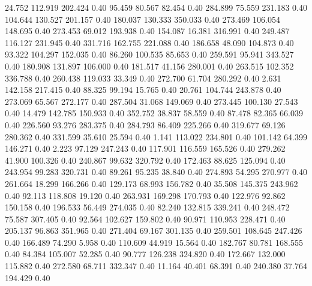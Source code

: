   24.752  112.919  202.424         0.40
  95.459   80.567   82.454         0.40
 284.899   75.559  231.183         0.40
 104.644  130.527  201.157         0.40
 180.037  130.333  350.033         0.40
 273.469  106.054  148.695         0.40
 273.453   69.012  193.938         0.40
 154.087   16.381  316.991         0.40
 249.487  116.127  231.945         0.40
 331.716  162.755  221.088         0.40
 186.658   48.090  104.873         0.40
  93.322  104.297  152.035         0.40
  86.260  100.535   85.653         0.40
 259.591   95.941  343.527         0.40
 180.908  131.897  106.000         0.40
 181.517   41.156  280.001         0.40
 263.515  102.352  336.788         0.40
 260.438  119.033   33.349         0.40
 272.700   61.704  280.292         0.40
   2.631  142.158  217.415         0.40
  88.325   99.194   15.765         0.40
  20.761  104.744  243.878         0.40
 273.069   65.567  272.177         0.40
 287.504   31.068  149.069         0.40
 273.445  100.130   27.543         0.40
  14.479  142.785  150.933         0.40
 352.752   38.837   58.559         0.40
  87.478   82.365   66.039         0.40
 226.560   93.276  283.375         0.40
 284.793   86.409  225.266         0.40
 319.677   69.126  280.362         0.40
 331.599   35.610   25.594         0.40
   1.141  113.022  234.801         0.40
 101.142   64.399  146.271         0.40
   2.223   97.129  247.243         0.40
 117.901  116.559  165.526         0.40
 279.262   41.900  100.326         0.40
 240.867   99.632  320.792         0.40
 172.463   88.625  125.094         0.40
 243.954   99.283  320.731         0.40
  89.261   95.235   38.840         0.40
 274.893   54.295  270.977         0.40
 261.664   18.299  166.266         0.40
 129.173   68.993  156.782         0.40
  35.508  145.375  243.962         0.40
  92.113  118.808   19.120         0.40
 263.931  169.298  170.793         0.40
 122.976   92.862  150.158         0.40
 196.533   56.449  274.035         0.40
  82.240  132.815  339.241         0.40
 248.472   75.587  307.405         0.40
  92.564  102.627  159.802         0.40
  90.971  110.953  228.471         0.40
 205.137   96.863  351.965         0.40
 271.404   69.167  301.135         0.40
 259.501  108.645  247.426         0.40
 166.489   74.290    5.958         0.40
 110.609   44.919   15.564         0.40
 182.767   80.781  168.555         0.40
  84.384  105.007   52.285         0.40
  90.777  126.238  324.820         0.40
 172.667  132.000  115.882         0.40
 272.580   68.711  332.347         0.40
  11.164   40.401   68.391         0.40
 240.380   37.764  194.429         0.40
